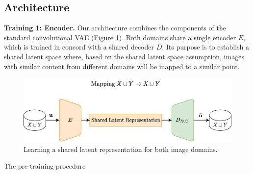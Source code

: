 \documentclass{article}
\begin{document}
\subsection{Architecture}
\textbf{Training 1: Encoder.} Our architecture combines the components of the standard convolutional VAE (Figure \ref{fig:pretrain}). Both domains share a single encoder $E$, which is trained in concord with a shared decoder $D$. Its purpose is to establish a shared latent space where, based on the shared latent space assumption, images with similar content from different domains will be mapped to a similar point.
\begin{figure}[H]
  \centering
  \includegraphics[width=0.8\linewidth]{report/assets/pretrain.png}
  \caption{Learning a shared latent representation for both image domains.}
  \label{fig:pretrain}
\end{figure}
\begin{algorithm}[H]
  \caption{The pre-training procedure}\label{alg:pre-train}
  \begin{algorithmic}
    
    
    
    
  \end{algorithmic}
  \end{algorithm}
\end{document}
